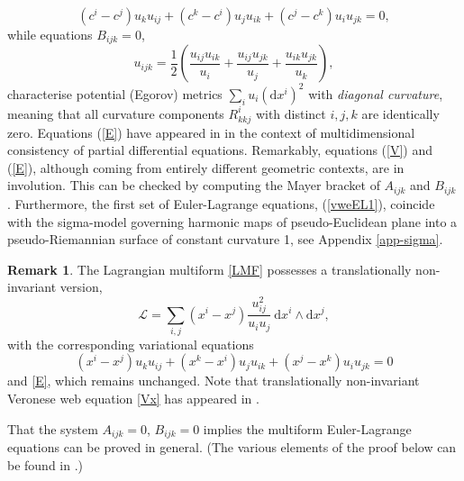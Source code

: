 \documentclass[12pt, a4paper]{article}
\theoremstyle{definition}
\newtheorem*{remark}{Remark}
\renewcommand{\d}{\mathrm{d}}
\newcommand{\cL}{\mathcal{L}}
\begin{document}
\begin{equation} \label{V}
	(c^i-c^j)u_ku_{ij}+(c^k-c^i)u_ju_{ik}+(c^j-c^k)u_iu_{jk}=0,
\end{equation}
while equations $B_{ijk}=0$,
\begin{equation} \label{E}
	u_{ijk}=\frac{1}{2}\left(\frac{u_{ij}u_{ik}}{u_i} +\frac{u_{ij}u_{jk}}{u_j}+\frac{u_{ik}u_{jk}}{u_k}\right),
\end{equation}
characterise potential (Egorov) metrics $\sum_i u_i (\d x^i)^2$ with \emph{diagonal curvature}, meaning that all curvature components $R^i_{kkj}$ with  distinct $i, j, k$ are identically zero. Equations (\ref{E}) have appeared in  \cite{schief2025affine} in the context of multidimensional consistency of partial differential equations.
Remarkably, equations (\ref{V}) and (\ref{E}), although coming from entirely different geometric contexts, are in involution. This can be checked by computing the Mayer bracket of $A_{ijk}$ and $B_{ijk}$ \cite{kruglikov2002mayer}. Furthermore, the first set of Euler-Lagrange equations, (\ref{vweEL1}), coincide with the  sigma-model governing harmonic maps of pseudo-Euclidean plane into a pseudo-Riemannian surface of constant curvature 1, see Appendix \ref{app-sigma}.

\begin{remark}
The Lagrangian multiform \eqref{LMF} possesses a translationally non-invariant version,
\begin{equation}\label{LMF1}
	\cL = \sum_{i,j}(x^i-x^j)\frac{u_{ij}^2}{u_iu_j}\ \d x^i\wedge \d x^j,
\end{equation}
with the corresponding variational equations
\begin{equation}\label{Vx}
	(x^i-x^j)u_{k}u_{ij}+(x^k-x^i)u_{j}u_{ik}+(x^j-x^k)u_{i}u_{jk}=0
\end{equation}
and \eqref{E}, which remains unchanged. Note that translationally non-invariant Veronese web equation \eqref{Vx} has appeared in \cite{kruglikov2017veronese, lobb2009lagrangian}.
\end{remark}

That the system $A_{ijk} = 0$, $B_{ijk} = 0$ implies the multiform Euler-Lagrange equations can be proved in general. (The various elements of the proof below can be found in \cite{petrera2021variational,sleigh2020variational,sleigh2023lagrangian,suris2016lagrangian}.)
\end{document}
